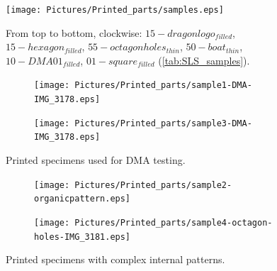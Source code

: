 \documentclass{article}
\begin{document}
        \begin{figure}[h!]
            \centering
            \texttt{[image: Pictures/Printed\_parts/samples.eps]}
            \caption{From top to bottom, clockwise: $15-dragonlogo_{filled}$, $15-hexagon_{filled}$, $55-octagonholes_{thin}$, 
            $50-boat_{thin}$, $10-DMA01_{filled}$, $01-square_{filled}$ (\ref{tab:SLS_samples}).}
            \label{fig:printed_specimens}
        \end{figure}

        \begin{figure}[h!]
            \centering
            \begin{subfigure}[a]{0.55\textwidth}
                \texttt{[image: Pictures/Printed\_parts/sample1-DMA-IMG\_3178.eps]}
            \end{subfigure}
                \vfill
            
            \begin{subfigure}[b]{0.5\textwidth}
                \centering
                \texttt{[image: Pictures/Printed\_parts/sample3-DMA-IMG\_3178.eps]}
                \end{subfigure}
            \caption{Printed specimens used for DMA testing.}
            \label{fig:printed_specimens_DMA}
        \end{figure}

        \begin{figure}[h!]
            \centering 
            \begin{subfigure}[a]{0.41\textwidth}
                \texttt{[image: Pictures/Printed\_parts/sample2-organicpattern.eps]}
            \end{subfigure}
                \vfill
            \begin{subfigure}[b]{0.5\textwidth}
                \centering
                \texttt{[image: Pictures/Printed\_parts/sample4-octagon-holes-IMG\_3181.eps]}
            \end{subfigure}
            \caption{Printed specimens with complex internal patterns.}
            \label{fig:printed_specimens_complex}
        \end{figure}
\end{document}
